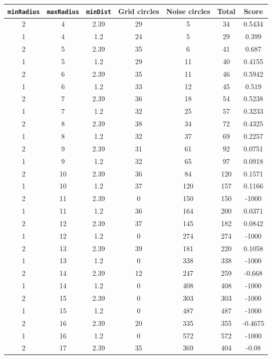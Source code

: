 \documentclass[letterpaper, 12pt]{article}
\begin{document}
\begin{longtable}{|c|c|c|c|c|c|c|}
\hline
\textbf{\texttt{minRadius}} & \textbf{\texttt{maxRadius}} & \textbf{\texttt{minDist}} & \textbf{Grid circles} & \textbf{Noise circles} & \textbf{Total} & \textbf{Score} \\
\hline
2 & 4 & 2.39 & 29 & 5 & 34 & 0.5434 \\
\hline
1 & 4 & 1.2 & 24 & 5 & 29 & 0.399 \\
\hline
2 & 5 & 2.39 & 35 & 6 & 41 & 0.687 \\
\hline
1 & 5 & 1.2 & 29 & 11 & 40 & 0.4155 \\
\hline
2 & 6 & 2.39 & 35 & 11 & 46 & 0.5942 \\
\hline
1 & 6 & 1.2 & 33 & 12 & 45 & 0.519 \\
\hline
2 & 7 & 2.39 & 36 & 18 & 54 & 0.5238 \\
\hline
1 & 7 & 1.2 & 32 & 25 & 57 & 0.3233 \\
\hline
2 & 8 & 2.39 & 38 & 34 & 72 & 0.4325 \\
\hline
1 & 8 & 1.2 & 32 & 37 & 69 & 0.2257 \\
\hline
2 & 9 & 2.39 & 31 & 61 & 92 & 0.0751 \\
\hline
1 & 9 & 1.2 & 32 & 65 & 97 & 0.0918 \\
\hline
2 & 10 & 2.39 & 36 & 84 & 120 & 0.1571 \\
\hline
1 & 10 & 1.2 & 37 & 120 & 157 & 0.1166 \\
\hline
2 & 11 & 2.39 & 0 & 150 & 150 & -1000 \\
\hline
1 & 11 & 1.2 & 36 & 164 & 200 & 0.0371 \\
\hline
2 & 12 & 2.39 & 37 & 145 & 182 & 0.0842 \\
\hline
1 & 12 & 1.2 & 0 & 274 & 274 & -1000 \\
\hline
2 & 13 & 2.39 & 39 & 181 & 220 & 0.1058 \\
\hline
1 & 13 & 1.2 & 0 & 338 & 338 & -1000 \\
\hline
2 & 14 & 2.39 & 12 & 247 & 259 & -0.668 \\
\hline
1 & 14 & 1.2 & 0 & 408 & 408 & -1000 \\
\hline
2 & 15 & 2.39 & 0 & 303 & 303 & -1000 \\
\hline
1 & 15 & 1.2 & 0 & 487 & 487 & -1000 \\
\hline
2 & 16 & 2.39 & 20 & 335 & 355 & -0.4675 \\
\hline
1 & 16 & 1.2 & 0 & 572 & 572 & -1000 \\
\hline
2 & 17 & 2.39 & 35 & 369 & 404 & -0.08 \\

\end{longtable}
\end{document}
